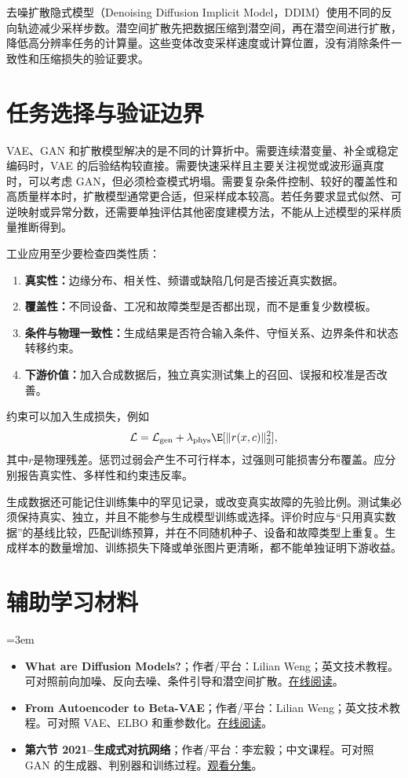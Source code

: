 去噪扩散隐式模型（Denoising Diffusion Implicit Model，DDIM）使用不同的反向轨迹减少采样步数。潜空间扩散先把数据压缩到潜空间，再在潜空间进行扩散，降低高分辨率任务的计算量。这些变体改变采样速度或计算位置，没有消除条件一致性和压缩损失的验证要求。

\section{任务选择与验证边界}

VAE、GAN 和扩散模型解决的是不同的计算折中。需要连续潜变量、补全或稳定编码时，VAE 的后验结构较直接。需要快速采样且主要关注视觉或波形逼真度时，可以考虑 GAN，但必须检查模式坍塌。需要复杂条件控制、较好的覆盖性和高质量样本时，扩散模型通常更合适，但采样成本较高。若任务要求显式似然、可逆映射或异常分数，还需要单独评估其他密度建模方法，不能从上述模型的采样质量推断得到。

工业应用至少要检查四类性质：
\begin{enumerate}
  \item \textbf{真实性：}边缘分布、相关性、频谱或缺陷几何是否接近真实数据。
  \item \textbf{覆盖性：}不同设备、工况和故障类型是否都出现，而不是重复少数模板。
  \item \textbf{条件与物理一致性：}生成结果是否符合输入条件、守恒关系、边界条件和状态转移约束。
  \item \textbf{下游价值：}加入合成数据后，独立真实测试集上的召回、误报和校准是否改善。
\end{enumerate}

约束可以加入生成损失，例如
\begin{equation}
\mathcal L=\mathcal L_{\mathrm{gen}}+\lambda_{\mathrm{phys}}\E[\|r(x,c)\|_2^2],
\end{equation}
其中$r$是物理残差。惩罚过弱会产生不可行样本，过强则可能损害分布覆盖。应分别报告真实性、多样性和约束违反率。

生成数据还可能记住训练集中的罕见记录，或改变真实故障的先验比例。测试集必须保持真实、独立，并且不能参与生成模型训练或选择。评价时应与“只用真实数据”的基线比较，匹配训练预算，并在不同随机种子、设备和故障类型上重复。生成样本的数量增加、训练损失下降或单张图片更清晰，都不能单独证明下游收益。

\section*{辅助学习材料}
\begingroup
\emergencystretch=3em
\begin{itemize}
\item \textbf{What are Diffusion Models?}；作者/平台：Lilian Weng；英文技术教程。可对照前向加噪、反向去噪、条件引导和潜空间扩散。\href{https://lilianweng.github.io/posts/2021-07-11-diffusion-models/}{在线阅读}。
\item \textbf{From Autoencoder to Beta-VAE}；作者/平台：Lilian Weng；英文技术教程。可对照 VAE、ELBO 和重参数化。\href{https://lilianweng.github.io/posts/2018-08-12-vae/}{在线阅读}。
\item \textbf{第六节 2021--生成式对抗网络}；作者/平台：李宏毅；中文课程。可对照 GAN 的生成器、判别器和训练过程。\href{https://www.bilibili.com/video/BV1Wv411h7kN/?p=58}{观看分集}。
\end{itemize}
\endgroup

